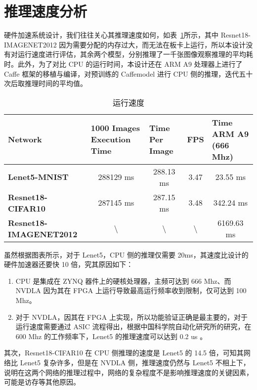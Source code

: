 \section{推理速度分析}

硬件加速系统设计，我们往往关心其推理速度如何，如表~\ref{tab:Execution Time}所示，其中 Resnet18-IMAGENET2012 因为需要分配的内存过大，而无法在板卡上运行，所以本设计没有对运行速度进行评估，其余两个模型，分别推理了一千张图像观察推理的平均耗时。此外，为了对比 CPU 的运行时间，本设计还在 ARM A9 处理器上进行了 Caffe 框架的移植与编译，对预训练的 Caffemodel 进行 CPU 侧的推理，迭代五十次后取推理时间的平均值。

\begin{table}[!htbp]
    \caption{运行速度}
    \label{tab:Execution Time}
    \centering
    \footnotesize%
    \setlength{\tabcolsep}{4pt}%
    \renewcommand{\arraystretch}{1.2}%
    \begin{tabular}{lcccc}
        \toprule
        \textbf{Network}                                   & \multicolumn{1}{l}{\textbf{1000 Images Execution Time}} & \multicolumn{1}{l}{\textbf{Time Per Image}} & \textbf{FPS}     & \multicolumn{1}{l}{\textbf{Time ARM A9 (666 Mhz)}} \\
        \midrule
        \textbf{Lenet5-MNIST}          & 288129 ms                                               & 288.13 ms                                   & 3.47             & 23.55 ms                                            \\
        \textbf{Resnet18-CIFAR10}      & 287145 ms                                               & 287.15 ms                                   & 3.48             & 342.24 ms                                          \\
        \textbf{Resnet18-IMAGENET2012} & \textbackslash{}                                        & \textbackslash{}                            & \textbackslash{} & 6169.63 ms                                         \\
        \bottomrule                   
    \end{tabular}
\end{table}

虽然根据图表所示，对于 Lenet5，CPU 侧的推理仅需要 20ms，其速度比设计的硬件加速器还要快 10 倍，究其原因如下：

\begin{enumerate}
    \item CPU 是集成在 ZYNQ 器件上的硬核处理器，主频可达到 666 Mhz、而 NVDLA 因为其在 FPGA 上运行导致最高运行频率收到限制，仅可达到 100 Mhz。
    \item 对于 NVDLA，因其在 FPGA 上实现，所以功能验证正确是最主要的，对于运行速度需要通过 ASIC 流程得出，根据中国科学院自动化研究所的研究，在 600 Mhz 的工作频率下，Lenet5 的推理速度可以达到 0.2 us \cite{9040769}。 
\end{enumerate}

其次，Resnet18-CIFAR10 在 CPU 侧推理的速度是 Lenet5 的 14.5 倍，可知其网络比 Lenet5 复杂许多，但是在 NVDLA 侧，推理速度仍然与 Lenet5 不相上下，说明在这两个网络的推理过程中，网络的复杂程度不是影响推理速度的关键因素，可能是访存等其他原因。